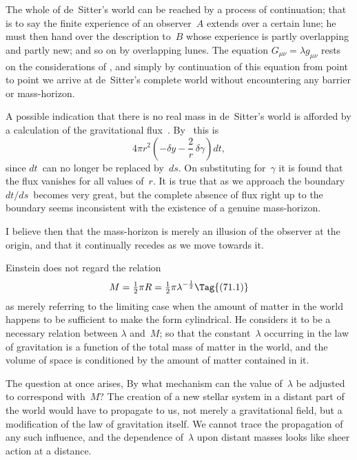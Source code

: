 \documentclass[12pt]{book}
\begin{document}
The whole of de~Sitter's world can be reached by a process of continuation;
that is to say the finite experience of an observer~$A$ extends over a certain
lune; he must then hand over the description to~$B$ whose experience is partly
overlapping and partly new; and so on by overlapping lunes. The equation
$G_{\mu\nu} = \lambda g_{\mu\nu}$ rests on the considerations of , and simply by continuation of
this equation from point to point we arrive at de~Sitter's complete world
without encountering any barrier or mass-horizon.

A possible indication that there is no real mass in de~Sitter's world is
afforded by a calculation of the gravitational flux~. By~ this is
\[
4\pi r^{2} \left(-\delta y - \frac{2}{r}\, \delta\gamma\right) dt,
\]
since $dt$~can no longer be replaced by~$ds$. On substituting for~$\gamma$ it is found
that the flux vanishes for all values of~$r$. It is true that as we approach the
boundary $dt/ds$~becomes very great, but the complete absence of flux right up
to the boundary seems inconsistent with the existence of a genuine mass-horizon.

I believe then that the mass-horizon is merely an illusion of the observer
at the origin, and that it continually recedes as we move towards it.

%

Einstein does not regard the relation~
\[
M = \tfrac{1}{2}\pi R = \tfrac{1}{2}\pi \lambda^{-\frac{1}{2}}
\Tag{(71.1)}
\]
as merely referring to the limiting case when the amount of matter in the
world happens to be sufficient to make the form cylindrical. He considers it
to be a necessary relation between $\lambda$ and~$M$; so that the constant~$\lambda$ occurring
in the law of gravitation is a function of the total mass of matter in the world,
and the volume of space is conditioned by the amount of matter contained
in it.

The question at once arises, By what mechanism can the value of~$\lambda$ be
adjusted to correspond with~$M$? The creation of a new stellar system in a
distant part of the world would have to propagate to us, not merely a gravitational
field, but a modification of the law of gravitation itself. We cannot
trace the propagation of any such influence, and the dependence of~$\lambda$ upon
distant masses looks like sheer action at a distance.
\end{document}
